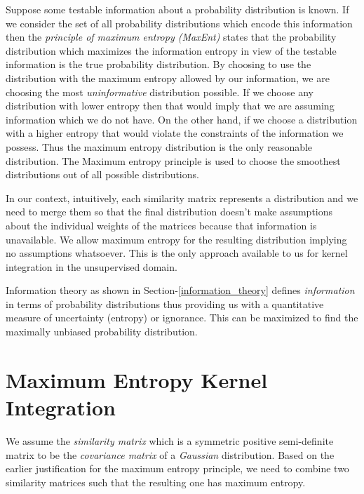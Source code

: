 Suppose some testable information about a probability distribution is known. If we consider the set of all 
probability distributions which encode this information then the \textit{principle of maximum entropy (MaxEnt)} 
states that the probability distribution which maximizes the information entropy in view of the testable 
information is the true probability distribution. By choosing to use the distribution with the maximum entropy 
allowed by our information, we are choosing the most \textit{uninformative} distribution possible. If we choose 
any distribution with lower entropy then that would imply that we are assuming information which we do not have. 
On the other hand, if we choose a distribution with a higher entropy that would violate the constraints of the 
information we possess. Thus the maximum entropy distribution is the only reasonable distribution. The Maximum 
entropy principle is used to choose the smoothest distributions out of all possible distributions. 

In our context, intuitively, each similarity matrix represents a distribution and we need to merge them so that the final distribution doesn't make assumptions about the individual weights of the matrices because that information is unavailable. We allow maximum entropy for the resulting distribution implying no assumptions whatsoever. This is the only approach available to us for kernel integration in the unsupervised domain.

Information theory as shown in Section-\ref{information_theory} defines \textit{information} in terms of probability distributions thus providing us with a quantitative measure of uncertainty (entropy) or ignorance. This can be maximized to find the maximally unbiased probability distribution. 

\section{Maximum Entropy Kernel Integration} \label{kern_integration}

We assume the \textit{similarity matrix} which is a symmetric positive semi-definite matrix to be the \textit{covariance matrix} of a \textit{Gaussian} distribution. Based on the earlier justification for the maximum entropy principle, we need to combine two similarity matrices such that the resulting one has maximum entropy. 


